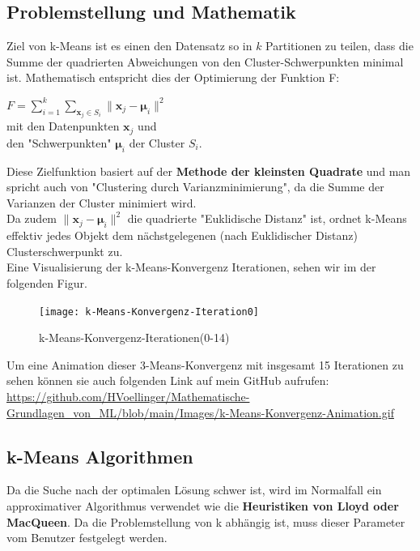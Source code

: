 \documentclass[12pt]{article}
\begin{document}
\subsection{Problemstellung und Mathematik}

Ziel von k-Means ist es einen den Datensatz so in $k$ Partitionen zu teilen, dass die Summe der quadrierten Abweichungen von den Cluster-Schwerpunkten minimal ist. Mathematisch entspricht dies der Optimierung der Funktion F:\\
\begin{center}
$ F = \sum_{i=1}^{k}  \sum_{\mathbf x_j \in S_{i}} {\| \mathbf x_j - \boldsymbol \mu_i \|^2}$ \\[0.2cm]
mit den Datenpunkten $ \mathbf x_j $ und \\
den "Schwerpunkten" $ \boldsymbol \mu_i $ der Cluster $ S_i $.\\[0.2cm]
\end{center}
%
Diese Zielfunktion basiert auf der \textbf{Methode der kleinsten Quadrate} und man spricht auch von "Clustering durch Varianzminimierung", da die Summe der Varianzen der Cluster minimiert wird.\\[0.2cm]
Da zudem $ \| \mathbf x_j - \boldsymbol \mu_i \|^2 $ die quadrierte "Euklidische Distanz" ist, ordnet k-Means effektiv jedes Objekt dem nächstgelegenen (nach Euklidischer Distanz) Clusterschwerpunkt zu.\\ 
Eine Visualisierung der k-Means-Konvergenz Iterationen, sehen wir im der folgenden Figur.
\newpage
%
\begin{figure}[htp]
  \centering
  \hspace*{-0.1cm} 
  \texttt{[image: k-Means-Konvergenz-Iteration0]}
  \caption{k-Means-Konvergenz-Iterationen(0-14)}
  \label{fig:k-Means-Iteration0}
\end{figure}
%
Um eine Animation dieser 3-Means-Konvergenz mit insgesamt 15 Iterationen zu sehen können sie auch folgenden Link auf mein GitHub aufrufen:\\
\url{https://github.com/HVoellinger/Mathematische-Grundlagen_von_ML/blob/main/Images/k-Means-Konvergenz-Animation.gif}\\

\subsection{k-Means Algorithmen}

Da die Suche nach der optimalen Lösung schwer ist, wird im Normalfall ein approximativer Algorithmus verwendet wie die \textbf{ Heuristiken von Lloyd oder MacQueen}. Da die Problemstellung von k abhängig ist, muss dieser Parameter vom Benutzer festgelegt werden.\\
\end{document}
